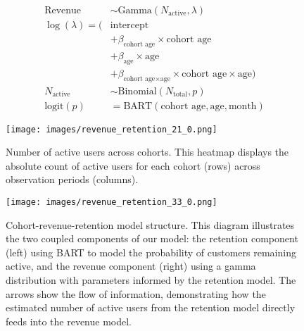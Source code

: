 \documentclass[11pt]{amsart}
\theoremstyle{definition}
\begin{document}
\begin{itemize}
          \begin{align*}
              \text{Revenue}    & \sim \text{Gamma}(N_{\text{active}}, \lambda)                                             \\
              \log(\lambda) = ( & \text{intercept}                                                                          \\
                                & + \beta_{\text{cohort age}} \times \text{cohort age}                                      \\
                                & + \beta_{\text{age}} \times \text{age}                                                    \\
                                & + \beta_{\text{cohort age} \times \text{age}} \times \text{cohort age} \times \text{age}) \\
              N_{\text{active}} & \sim \text{Binomial}(N_{\text{total}}, p)                                                 \\
              \textrm{logit}(p) & = \text{BART}(\text{cohort age}, \text{age}, \text{month})
          \end{align*}

\end{itemize}

\begin{figure}
    \centering
    \texttt{[image: images/revenue\_retention\_21\_0.png]}
    \caption{Number of active users across cohorts. This heatmap displays the absolute count of active users for each
        cohort (rows) across observation periods (columns).}
    \label{fig:active_users}
\end{figure}

\begin{figure}
    \centering
    \texttt{[image: images/revenue\_retention\_33\_0.png]}
    \caption{Cohort-revenue-retention model structure. This diagram illustrates the two coupled components of our model:
        the retention component (left) using BART to model the probability of customers remaining active, and the
        revenue component (right) using a gamma distribution with parameters informed by the retention model. The arrows
        show the flow of information, demonstrating how the estimated number of active users from the retention model
        directly feeds into the revenue model.}
    \label{fig:revenue_retention_model}
\end{figure}
\end{document}
